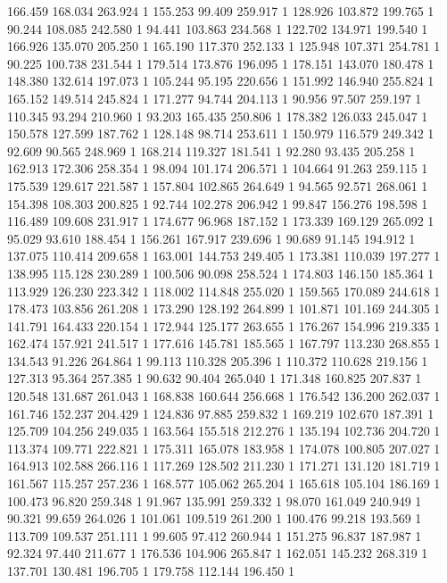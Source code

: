 	166.459	168.034	263.924	1
	155.253	99.409	259.917	1
	128.926	103.872	199.765	1
	90.244	108.085	242.580	1
	94.441	103.863	234.568	1
	122.702	134.971	199.540	1
	166.926	135.070	205.250	1
	165.190	117.370	252.133	1
	125.948	107.371	254.781	1
	90.225	100.738	231.544	1
	179.514	173.876	196.095	1
	178.151	143.070	180.478	1
	148.380	132.614	197.073	1
	105.244	95.195	220.656	1
	151.992	146.940	255.824	1
	165.152	149.514	245.824	1
	171.277	94.744	204.113	1
	90.956	97.507	259.197	1
	110.345	93.294	210.960	1
	93.203	165.435	250.806	1
	178.382	126.033	245.047	1
	150.578	127.599	187.762	1
	128.148	98.714	253.611	1
	150.979	116.579	249.342	1
	92.609	90.565	248.969	1
	168.214	119.327	181.541	1
	92.280	93.435	205.258	1
	162.913	172.306	258.354	1
	98.094	101.174	206.571	1
	104.664	91.263	259.115	1
	175.539	129.617	221.587	1
	157.804	102.865	264.649	1
	94.565	92.571	268.061	1
	154.398	108.303	200.825	1
	92.744	102.278	206.942	1
	99.847	156.276	198.598	1
	116.489	109.608	231.917	1
	174.677	96.968	187.152	1
	173.339	169.129	265.092	1
	95.029	93.610	188.454	1
	156.261	167.917	239.696	1
	90.689	91.145	194.912	1
	137.075	110.414	209.658	1
	163.001	144.753	249.405	1
	173.381	110.039	197.277	1
	138.995	115.128	230.289	1
	100.506	90.098	258.524	1
	174.803	146.150	185.364	1
	113.929	126.230	223.342	1
	118.002	114.848	255.020	1
	159.565	170.089	244.618	1
	178.473	103.856	261.208	1
	173.290	128.192	264.899	1
	101.871	101.169	244.305	1
	141.791	164.433	220.154	1
	172.944	125.177	263.655	1
	176.267	154.996	219.335	1
	162.474	157.921	241.517	1
	177.616	145.781	185.565	1
	167.797	113.230	268.855	1
	134.543	91.226	264.864	1
	99.113	110.328	205.396	1
	110.372	110.628	219.156	1
	127.313	95.364	257.385	1
	90.632	90.404	265.040	1
	171.348	160.825	207.837	1
	120.548	131.687	261.043	1
	168.838	160.644	256.668	1
	176.542	136.200	262.037	1
	161.746	152.237	204.429	1
	124.836	97.885	259.832	1
	169.219	102.670	187.391	1
	125.709	104.256	249.035	1
	163.564	155.518	212.276	1
	135.194	102.736	204.720	1
	113.374	109.771	222.821	1
	175.311	165.078	183.958	1
	174.078	100.805	207.027	1
	164.913	102.588	266.116	1
	117.269	128.502	211.230	1
	171.271	131.120	181.719	1
	161.567	115.257	257.236	1
	168.577	105.062	265.204	1
	165.618	105.104	186.169	1
	100.473	96.820	259.348	1
	91.967	135.991	259.332	1
	98.070	161.049	240.949	1
	90.321	99.659	264.026	1
	101.061	109.519	261.200	1
	100.476	99.218	193.569	1
	113.709	109.537	251.111	1
	99.605	97.412	260.944	1
	151.275	96.837	187.987	1
	92.324	97.440	211.677	1
	176.536	104.906	265.847	1
	162.051	145.232	268.319	1
	137.701	130.481	196.705	1
	179.758	112.144	196.450	1
